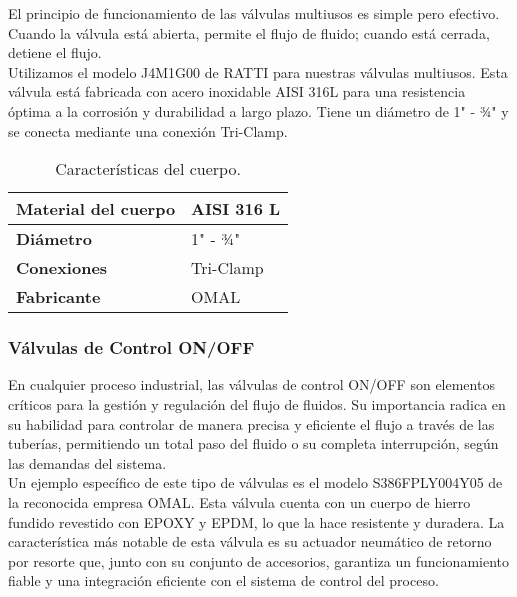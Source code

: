 El principio de funcionamiento de las válvulas multiusos es simple pero efectivo. Cuando la válvula está abierta, permite el flujo de fluido; cuando está cerrada, detiene el flujo.\\

Utilizamos el modelo J4M1G00 de RATTI para nuestras válvulas multiusos. Esta válvula está fabricada con acero inoxidable AISI 316L para una resistencia óptima a la corrosión y durabilidad a largo plazo. Tiene un diámetro de 1" - ¾" y se conecta mediante una conexión Tri-Clamp.\\

\begin{table}[H]
    \centering
    \caption{Características del cuerpo.}
    \label{table:valvula_multiusos}
    \begin{tabular}{| L{6cm} | L{6cm} |}
        \hline
        \textbf{Material del cuerpo} & AISI 316 L \\
        \hline
        \textbf{Diámetro} & 1" - ¾" \\
        \hline
        \textbf{Conexiones} & Tri-Clamp \\
        \hline
        \textbf{Fabricante} & OMAL \\
        \hline
    \end{tabular}
\end{table}

\subsubsection{Válvulas de Control ON/OFF} \label{sec:valvula_OnOff}

En cualquier proceso industrial, las válvulas de control ON/OFF son elementos críticos para la gestión y regulación del flujo de fluidos. Su importancia radica en su habilidad para controlar de manera precisa y eficiente el flujo a través de las tuberías, permitiendo un total paso del fluido o su completa interrupción, según las demandas del sistema.\\

Un ejemplo específico de este tipo de válvulas es el modelo S386FPLY004Y05 de la reconocida empresa OMAL. Esta válvula cuenta con un cuerpo de hierro fundido revestido con EPOXY y EPDM, lo que la hace resistente y duradera. La característica más notable de esta válvula es su actuador neumático de retorno por resorte que, junto con su conjunto de accesorios, garantiza un funcionamiento fiable y una integración eficiente con el sistema de control del proceso.\\


